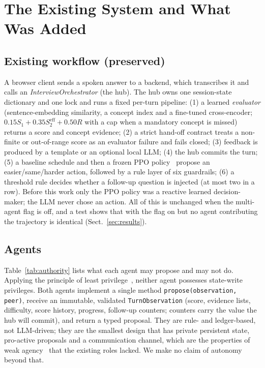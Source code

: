 \section{The Existing System and What Was Added}\label{sec:design}
\subsection{Existing workflow (preserved)}
A browser client sends a spoken answer to a backend, which transcribes it and calls an \emph{InterviewOrchestrator} (the hub). The hub owns one session-state dictionary and one lock and runs a fixed per-turn pipeline: (1) a learned \emph{evaluator} (sentence-embedding similarity, a concept index and a fine-tuned cross-encoder; $0.15S_1{+}0.35S_2^{\mathrm{eff}}{+}0.50R$ with a cap when a mandatory concept is missed) returns a score and concept evidence; (2) a strict hand-off contract treats a non-finite or out-of-range score as an evaluator failure and fails closed; (3) feedback is produced by a template or an optional local LLM; (4) the hub commits the turn; (5) a baseline schedule and then a frozen PPO policy~\cite{ppo,sb3} propose an easier/same/harder action, followed by a rule layer of six guardrails; (6) a threshold rule decides whether a follow-up question is injected (at most two in a row). Before this work only the PPO policy was a reactive learned decision-maker; the LLM never chose an action. All of this is unchanged when the multi-agent flag is off, and a test shows that with the flag on but no agent contributing the trajectory is identical (Sect.~\ref{sec:results}).

\subsection{Agents}
\begin{table}[tbp]
\centering\small
\caption{Authority matrix, generated from the enforcing code (\texttt{agents/multiagent/} \texttt{authority.py}). Neither agent has state-write authority; the hub commits alone.}\label{tab:authority}

\end{table}
Table~\ref{tab:authority} lists what each agent may propose and may not do. Applying the principle of least privilege~\cite{ss75}, neither agent possesses state-write privileges. Both agents implement a single method \texttt{propose(observation, peer)}, receive an immutable, validated \texttt{TurnObservation} (score, evidence lists, difficulty, score history, progress, follow-up counters; counters carry the value the hub will commit), and return a typed proposal. They are rule- and ledger-based, not LLM-driven; they are the smallest design that has private persistent state, pro-active proposals and a communication channel, which are the properties of weak agency~\cite{wj95} that the existing roles lacked. We make no claim of autonomy beyond that.


